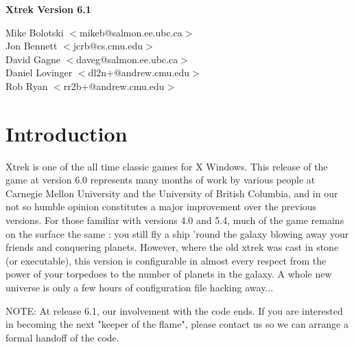 

\def\tty#1{{\tt #1}}
\def\bold#1{{\bf #1}}

\parindent 0in
\parskip 0.10in 
\textwidth 6.5in
\oddsidemargin 0in
\evensidemargin 0in
\textheight 8.175in
\topmargin -0.25in



\begin{titlepage}
\begin{center}
\vspace*{2in}
\bf
\Huge
Xtrek Version 6.1

\vspace{2in}

\LARGE
Mike Bolotski $<$mikeb@salmon.ee.ubc.ca$>$ \\
Jon Bennett $<$jcrb@cs.cmu.edu$>$ \\
David Gagne $<$daveg@salmon.ee.ubc.ca$>$ \\
Daniel Lovinger $<$dl2n+@andrew.cmu.edu$>$ \\
Rob Ryan $<$rr2b+@andrew.cmu.edu$>$
\end{center}
\end{titlepage}



\tableofcontents \newpage

\section{Introduction}

Xtrek is one of the all time classic games for X Windows. This release
of the game at version 6.0 represents many  months of
work by various people at Carnegie Mellon University and the University
of British Columbia, and in our not so humble opinion constitutes a major
improvement over the previous versions. For those familiar with
versions 4.0 and 5.4, much of the game remains on the surface the same : you
still fly a ship 'round the galaxy blowing away your friends and
conquering planets. However, where the old xtrek was cast in stone (or
executable), this version is configurable in almost every respect from
the power of your torpedoes to the number of planets in the galaxy. A
whole new universe is only a few hours of configuration file hacking
away...

NOTE: At release 6.1, our involvement with the code ends. If you are interested
in becoming the next "keeper of the flame", please contact us so we can arrange
a formal handoff of the code.

